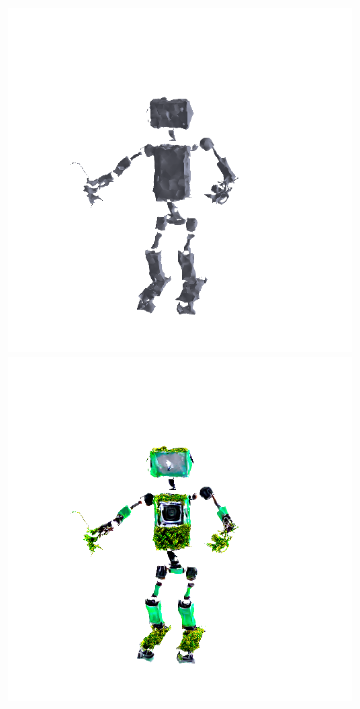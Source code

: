 \begin{figure}[ht]
\begin{subfigure}[b]{0.20\textwidth}
        \caption{}
    \end{subfigure}
    \begin{subfigure}[b]{0.20\textwidth}
        \centering
        \includegraphics[width=\textwidth]{etc/a robot made out of plants/fantasia3d_fromMesh/fantasia_refine_robot_0_part1.png}
        \includegraphics[width=\textwidth]{etc/a robot made out of plants/fantasia3d_fromMesh/fantasia_refine_robot_5000_part1.png}

\end{subfigure}
\end{figure}
